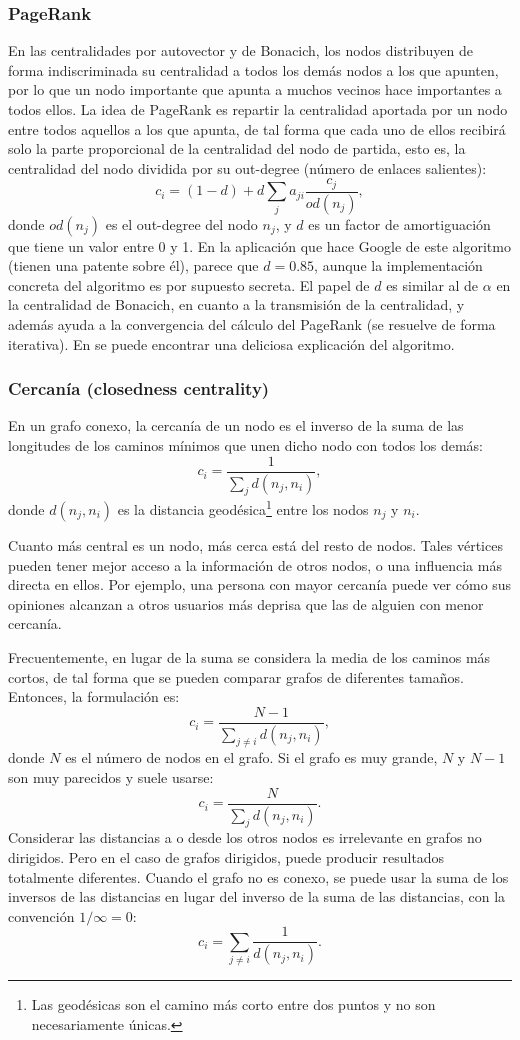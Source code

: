 \subsubsection{PageRank}
En las centralidades por autovector y de Bonacich, los nodos
distribuyen de forma indiscriminada su centralidad a todos los demás nodos a los que apunten, 
por lo que un nodo importante que apunta a muchos vecinos hace importantes a 
todos ellos. La idea de PageRank es repartir la centralidad aportada 
por un nodo entre todos aquellos a los que apunta, de tal forma que cada uno de ellos
recibirá solo la parte proporcional de la centralidad del nodo de partida, esto es,
la centralidad del nodo dividida por su out-degree (número de enlaces salientes):
$$c_i = (1-d) + d\sum_j a_{ji} \frac{c_j}{od(n_j)},$$
donde $od(n_j)$ es el out-degree del nodo $n_j$, y $d$ es un factor de amortiguación 
que tiene un valor entre 0 y 1. En la aplicación que hace Google de este algoritmo
(tienen una patente sobre él), parece que $d=0.85$, aunque la 
implementación concreta del algoritmo es por supuesto secreta. El papel de
$d$ es similar al de $\alpha$ en la centralidad de Bonacich, en
cuanto a la transmisión de la centralidad, y además ayuda a la convergencia
del cálculo del PageRank (se resuelve de forma iterativa).
En \cite{fdez} se puede encontrar una deliciosa explicación del algoritmo.

\subsubsection{Cercanía (closedness centrality)}
En un grafo conexo, la cercanía 
de un nodo es el inverso de la suma de las longitudes
de los caminos mínimos que unen dicho nodo con todos los demás:
$$c_i=\frac {1}{\sum _{j}d(n_j,n_i)},$$
donde $d(n_j,n_i)$ es la distancia geodésica\footnote{Las geodésicas son el camino
más corto entre dos puntos y no son necesariamente únicas.} 
entre los nodos $n_j$ y $n_i$. 

Cuanto más central es un nodo,
más cerca está del resto de nodos. Tales vértices pueden tener mejor acceso
a la información de otros nodos, o una influencia más directa en ellos. Por ejemplo, una persona
con mayor cercanía puede ver cómo sus opiniones alcanzan a otros usuarios más deprisa que 
las de alguien con menor cercanía. 

Frecuentemente, en lugar de la suma se considera la media de los caminos más cortos, 
de tal forma que se pueden comparar grafos de diferentes tamaños. Entonces, la formulación es:
$$c_i=\frac {N-1}{\sum _{j\neq i}d(n_j,n_i)},$$
donde $N$ es el número de nodos en el grafo. Si el grafo es muy grande, 
$N$ y $N-1$ son muy parecidos y suele usarse:  
$$c_i=\frac {N}{\sum _{j}d(n_j,n_i)}.$$
Considerar las distancias a o desde los otros nodos es irrelevante en grafos no dirigidos.
Pero en el caso de grafos dirigidos, puede producir resultados totalmente diferentes.
Cuando el grafo no es conexo, se puede usar la suma de los inversos de las distancias
en lugar del inverso de la suma de las distancias, con la convención 
$1/\infty =0$:
$$c_i=\sum _{j\neq i}\frac {1}{d(n_j,n_i)}.$$

